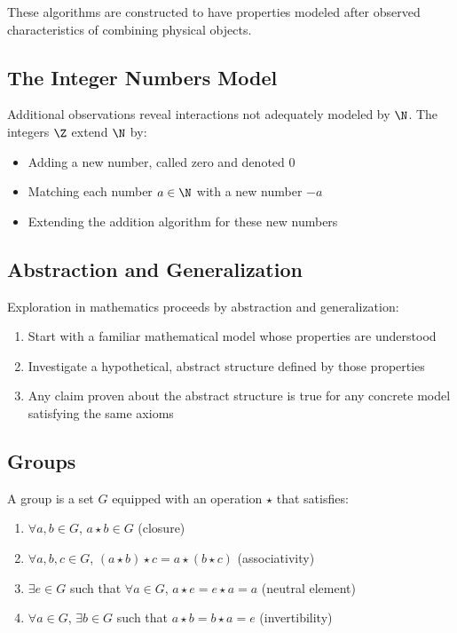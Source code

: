 These algorithms are constructed to have properties modeled after observed characteristics of combining physical objects.

\subsection{The Integer Numbers Model}

Additional observations reveal interactions not adequately modeled by $\N$. The integers $\Z$ extend $\N$ by:
\begin{itemize}
    \item Adding a new number, called zero and denoted $0$
    \item Matching each number $a \in \N$ with a new number $-a$
    \item Extending the addition algorithm for these new numbers
\end{itemize}

\subsection{Abstraction and Generalization}

Exploration in mathematics proceeds by abstraction and generalization:
\begin{enumerate}
    \item Start with a familiar mathematical model whose properties are understood
    \item Investigate a hypothetical, abstract structure defined by those properties
    \item Any claim proven about the abstract structure is true for any concrete model satisfying the same axioms
\end{enumerate}

\subsection{Groups}

\begin{definition}[Group]\label{def:group}
    A group is a set $G$ equipped with an operation $\star$ that satisfies:
    \begin{enumerate}[label=(\roman*)]
        \item $\forall a, b \in G$, $a \star b \in G$ (closure)
        \item $\forall a, b, c \in G$, $(a \star b) \star c = a \star (b \star c)$ (associativity)
        \item $\exists e \in G$ such that $\forall a \in G$, $a \star e = e \star a = a$ (neutral element)
        \item $\forall a \in G$, $\exists b \in G$ such that $a \star b = b \star a = e$ (invertibility)
    \end{enumerate}
\end{definition}

